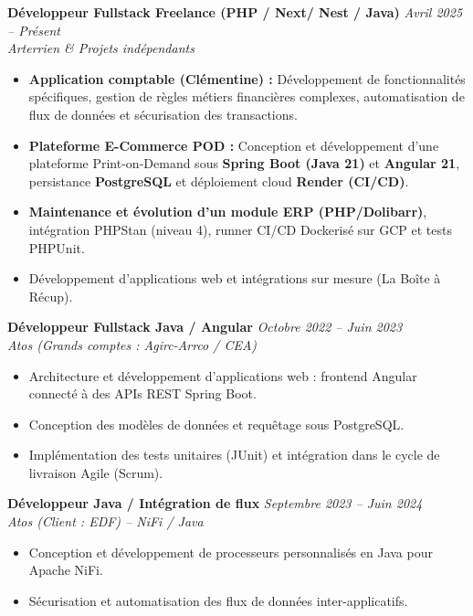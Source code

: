 \documentclass[a4paper,10pt]{article}
\newcommand{\cvtext}{\fontsize{9}{11}\selectfont}
\begin{document}
\begin{minipage}[t]{0.68\textwidth}
\begin{tcolorbox}[cvbox, width=\linewidth, fontupper=\cvtext]
\textcolor{bleu}{\textbf{Développeur Fullstack Freelance (PHP / Next/ Nest / Java)}} \hfill \textit{Avril 2025 -- Présent}\\
\textit{Arterrien \& Projets indépendants}
\begin{itemize}[leftmargin=*]
    \item \textbf{Application comptable (Clémentine) :} Développement de fonctionnalités spécifiques, gestion de règles métiers financières complexes, automatisation de flux de données et sécurisation des transactions.
    \item \textbf{Plateforme E-Commerce POD :} Conception et développement d'une plateforme Print-on-Demand sous \textbf{Spring Boot (Java 21)} et \textbf{Angular 21}, persistance \textbf{PostgreSQL} et déploiement cloud \textbf{Render (CI/CD)}.
  \item \textbf{Maintenance et évolution d'un module ERP (PHP/Dolibarr)}, intégration PHPStan (niveau 4), runner CI/CD Dockerisé sur GCP et tests PHPUnit.
  \item Développement d'applications web et intégrations sur mesure (La Boîte à Récup).
\end{itemize}
\vspace{0.8em}

    \textcolor{bleu}{\textbf{Développeur Fullstack Java / Angular}} \hfill \textit{Octobre 2022 -- Juin 2023}\\
    \textit{Atos (Grands comptes : Agirc-Arrco / CEA)}
    \begin{itemize}[leftmargin=*]
      \item Architecture et développement d'applications web : frontend Angular connecté à des APIs REST Spring Boot.
      \item Conception des modèles de données et requêtage sous PostgreSQL.
      \item Implémentation des tests unitaires (JUnit) et intégration dans le cycle de livraison Agile (Scrum).
    \end{itemize}
    \vspace{0.8em}

    \textcolor{bleu}{\textbf{Développeur Java / Intégration de flux}} \hfill \textit{Septembre 2023 -- Juin 2024}\\
    \textit{Atos (Client : EDF) -- NiFi / Java}
    \begin{itemize}[leftmargin=*]
      \item Conception et développement de processeurs personnalisés en Java pour Apache NiFi.
      \item Sécurisation et automatisation des flux de données inter-applicatifs.
    \end{itemize}
    \vspace{0.8em}


\end{tcolorbox}
\end{minipage}
\end{document}
